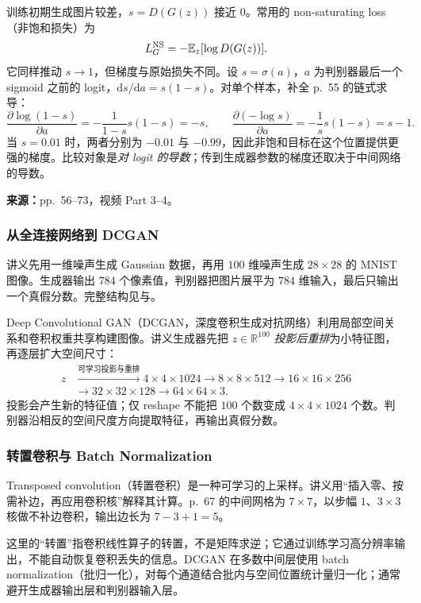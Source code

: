 训练初期生成图片较差，$s=D(G(z))$ 接近 $0$。常用的 non-saturating loss（非饱和损失）为
\[
 L_G^{\rm NS}=-\mathbb E_z[\log D(G(z))].
\]
它同样推动 $s\to1$，但梯度与原始损失不同。设 $s=\sigma(a)$，$a$ 为判别器最后一个 sigmoid 之前的 logit，$\mathrm ds/\mathrm da=s(1-s)$。对单个样本，补全 p.~55 的链式求导：
\[
 \frac{\partial\log(1-s)}{\partial a}
 =-\frac1{1-s}s(1-s)=-s,
 \qquad
 \frac{\partial(-\log s)}{\partial a}
 =-\frac1s s(1-s)=s-1.
\]
当 $s=0.01$ 时，两者分别为 $-0.01$ 与 $-0.99$，因此非饱和目标在这个位置提供更强的梯度。比较对象是\emph{对 logit 的导数}；传到生成器参数的梯度还取决于中间网络的导数。


\textbf{来源：}pp.~56--73，视频 Part 3--4。

\subsubsection{从全连接网络到 DCGAN}

讲义先用一维噪声生成 Gaussian 数据，再用 $100$ 维噪声生成 $28\times28$ 的 MNIST 图像。生成器输出 $784$ 个像素值，判别器把图片展平为 $784$ 维输入，最后只输出一个真假分数。完整结构见与。

Deep Convolutional GAN（DCGAN，深度卷积生成对抗网络）利用局部空间关系和卷积权重共享构建图像。讲义生成器先把 $z\in\mathbb R^{100}$ \emph{投影后重排}为小特征图，再逐层扩大空间尺寸：
\[
 \begin{aligned}
 z&\xrightarrow{\text{可学习投影与重排}}4\times4\times1024
    \to8\times8\times512\to16\times16\times256\\
  &\to32\times32\times128\to64\times64\times3.
 \end{aligned}
\]
投影会产生新的特征值；仅 reshape 不能把 $100$ 个数变成 $4\times4\times1024$ 个数。判别器沿相反的空间尺度方向提取特征，再输出真假分数。

\subsubsection{转置卷积与 Batch Normalization}

Transposed convolution（转置卷积）是一种可学习的上采样。讲义用“插入零、按需补边，再应用卷积核”解释其计算。p.~67 的中间网格为 $7\times7$，以步幅 $1$、$3\times3$ 核做不补边卷积，输出边长为 $7-3+1=5$。

这里的“转置”指卷积线性算子的转置，不是矩阵求逆；它通过训练学习高分辨率输出，不能自动恢复卷积丢失的信息。DCGAN 在多数中间层使用 batch normalization（批归一化），对每个通道结合批内与空间位置统计量归一化；通常避开生成器输出层和判别器输入层。

